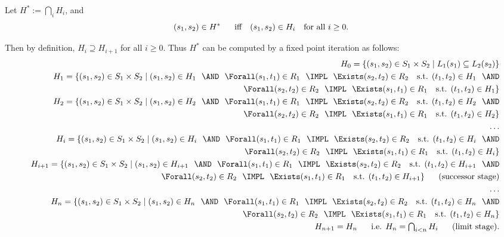 Let $H^{\ast }:=\bigcap\nolimits_{i}H_{i}$, and%
\begin{equation*}
(s_{1},s_{2})\in H^{\ast }\quad \text{iff\quad }(s_{1},s_{2})\in H_{i}\text{
for all }i\geq 0.
\end{equation*}

Then by definition, $H_{i}\supseteq H_{i+1}$ for all $i\geq 0$. Thus $%
H^{\ast }$ can be computed by a fixed point iteration as follows:%
\begin{eqnarray*}
&&H_{0}=\{(s_{1},s_{2})\in S_{1}\times S_{2}\mid L_{1}(s_{1})\subseteq
L_{2}(s_{2})\} \\
&&H_{1}=\{(s_{1},s_{2})\in S_{1}\times S_{2}\mid (s_{1},s_{2})\in H_{1} \AND%
\Forall (s_{1},t_{1})\in R_{1}\IMPL\Exists (s_{2},t_{2})\in R_{2}\text{ s.t. }%
(t_{1},t_{2})\in H_{1}\AND \\
&&\Forall (s_{2},t_{2})\in R_{2}\IMPL\Exists (s_{1},t_{1})\in R_{1}\text{
s.t. }(t_{1},t_{2})\in H_{1}\} \\
&&H_{2}=\{(s_{1},s_{2})\in S_{1}\times S_{2}\mid (s_{1},s_{2})\in H_{2}\AND%
\Forall(s_{1},t_{1})\in R_{1}\IMPL\Exists (s_{2},t_{2})\in R_{2}\text{ s.t. }%
(t_{1},t_{2})\in H_{2}\AND \\
&&\Forall (s_{2},t_{2})\in R_{2}\IMPL\Exists (s_{1},t_{1})\in R_{1}\text{
s.t. }(t_{1},t_{2})\in H_{2}\} \\
&&\ldots \\
&&H_{i}=\{(s_{1},s_{2})\in S_{1}\times S_{2}\mid (s_{1},s_{2})\in H_{i} \AND%
\Forall (s_{1},t_{1})\in R_{1}\IMPL\Exists (s_{2},t_{2})\in R_{2}\text{ s.t. }%
(t_{1},t_{2})\in H_{i}\AND \\
&&\Forall (s_{2},t_{2})\in R_{2}\IMPL\Exists (s_{1},t_{1})\in R_{1}\text{
s.t. }(t_{1},t_{2})\in H_{i}\} \\
&&H_{i+1}=\{(s_{1},s_{2})\in S_{1}\times S_{2}\mid (s_{1},s_{2})\in H_{i+1}%
\AND\Forall (s_{1},t_{1})\in R_{1}\IMPL\Exists (s_{2},t_{2})\in R_{2}\text{
s.t. }(t_{1},t_{2})\in H_{i+1}\AND \\
&&\Forall (s_{2},t_{2})\in R_{2}\IMPL\Exists (s_{1},t_{1})\in R_{1}\text{
s.t. }(t_{1},t_{2})\in H_{i+1}\}\quad \text{(successor stage)} \\
&&\ldots \\
&&H_{n}=\{(s_{1},s_{2})\in S_{1}\times S_{2}\mid (s_{1},s_{2})\in H_{n} \AND%
\Forall (s_{1},t_{1})\in R_{1}\IMPL\Exists (s_{2},t_{2})\in R_{2}\text{ s.t. }%
(t_{1},t_{2})\in H_{n}\AND \\
&&\Forall(s_{2},t_{2})\in R_{2}\IMPL\Exists (s_{1},t_{1})\in R_{1}\text{
s.t. }(t_{1},t_{2})\in H_{n}\} \\
&&H_{n+1}=H_{n}\quad \text{i.e. }H_{n}=\tbigcap\nolimits_{i<n}H_{i}\quad\text{%
(limit stage).}
\end{eqnarray*}

